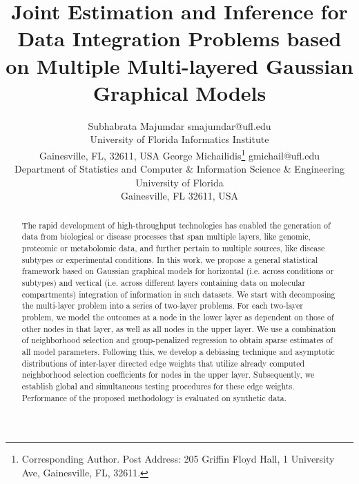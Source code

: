 \documentclass[twoside,11pt]{article}
\numberwithin{equation}{section}
\begin{document}
\newtheorem{Theorem}{theorem}[section]
\newtheorem{Lemma}[Theorem]{Lemma}
\newtheorem{Corollary}[Theorem]{Corollary}
\newtheorem{Proposition}[Theorem]{Proposition}
\newtheorem{Conjecture}[Theorem]{Conjecture}
\theoremstyle{definition} \newtheorem{Definition}[Theorem]{Definition}
\newtheorem{Example}{Example}[section]
\newtheorem{Algorithm}{Algorithm}
\newtheorem{Remark}{Remark}

\title{Joint Estimation and Inference for Data Integration Problems based on Multiple Multi-layered Gaussian Graphical Models}
\date{}
\author{\name Subhabrata Majumdar \email smajumdar@ufl.edu \\
       \addr University of Florida Informatics Institute\\
       Gainesville, FL, 32611, USA
      \AND
      \name George Michailidis\thanks{Corresponding Author. Post Address: 205 Griffin Floyd Hall, 1 University Ave, Gainesville, FL, 32611.} \email gmichail@ufl.edu \\
      \addr Department of Statistics and Computer \& Information Science \& Engineering \\
      University of Florida \\
      Gainesville, FL 32611, USA 
       }

\editor{}
\maketitle

\begin{abstract} %
The rapid development of high-throughput technologies has enabled the generation of data from biological or disease processes that span multiple layers, like genomic, proteomic or metabolomic data, and further pertain to multiple sources, like disease subtypes or experimental conditions. In this work, we propose a general statistical framework based on Gaussian graphical models for horizontal (i.e. across conditions or subtypes) and vertical (i.e. across different layers containing data on molecular compartments) integration of information in such datasets. We start with decomposing the multi-layer problem into a series of two-layer problems. For each two-layer problem, we model the outcomes at a node in the lower layer as dependent on those of other nodes in that layer, as well as all nodes in the upper layer. We use a combination of neighborhood selection and group-penalized regression to obtain sparse estimates of all model parameters. Following this, we develop a debiasing technique and asymptotic distributions of inter-layer directed edge weights that utilize already computed neighborhood selection coefficients for nodes in the upper layer. Subsequently, we establish global and simultaneous testing procedures for these edge weights. Performance of the proposed methodology is evaluated on synthetic data.
\end{abstract}
\end{document}
